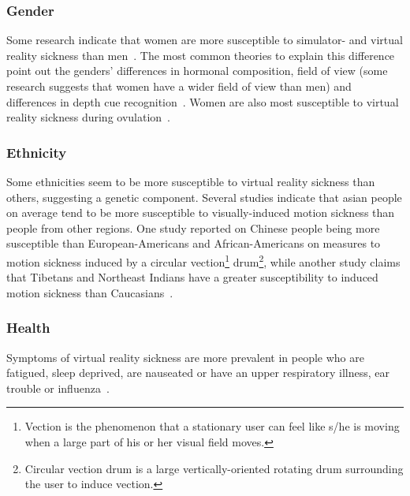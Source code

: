 \subsubsection{Gender}
Some research indicate that women are more susceptible to simulator- and virtual reality sickness than men~\citep{Kennedy1985}. 
The most common theories to explain this difference point out the genders' differences
in hormonal composition, field of view (some research suggests that women have a wider field of view than men) and differences in depth cue recognition~\citep{Biomed2012}. 
Women are also most susceptible to virtual reality sickness during ovulation~\citep{Clemes2005}.

\subsubsection{Ethnicity}
Some ethnicities seem to be more susceptible to virtual reality sickness than others, suggesting a genetic component. 
Several studies indicate that asian people on average tend to be more susceptible to visually-induced motion sickness than people from other regions.
One study reported on Chinese people being more susceptible than European-Americans and African-Americans on measures to motion sickness induced by a 
circular vection\footnote{Vection is the phenomenon that a stationary user can feel like s/he is moving when a large part of his or her visual field moves.} 
drum\footnote{Circular vection drum is a large vertically-oriented rotating drum surrounding the user to induce vection.}, 
while another study claims that Tibetans and Northeast Indians have a greater susceptibility to induced motion sickness than Caucasians~\citep{Barrett2004}.


\subsubsection{Health}
Symptoms of virtual reality sickness are more prevalent in people who are fatigued, sleep deprived, are nauseated or have an upper respiratory illness, 
ear trouble or influenza~\citep{Kolasinski1995}.

